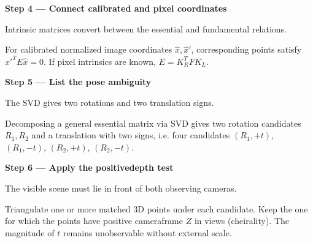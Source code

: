 \documentclass[letterpaper,11pt,english,openany,oneside]{jupyterBook}
\begin{document}
\par

\par\medskip{}
{\color{QuizStepRed}\bfseries Step 4 — Connect calibrated and pixel coordinates}\par\smallskip

\sphinxAtStartPar
{} Intrinsic matrices convert between the essential and fundamental relations.

\sphinxAtStartPar
For calibrated normalized image coordinates {\color{QuizMathBlue} \(\hat x,\hat x'\)}, corresponding points satisfy {\color{QuizMathBlue} \(\hat x'^TE\hat x=0\)}. If pixel intrinsics are known, {\color{QuizMathBlue} \(E=K_R^TFK_L\)}.

\par

\par\medskip{}
{\color{QuizStepRed}\bfseries Step 5 — List the pose ambiguity}\par\smallskip

\sphinxAtStartPar
{} The SVD gives two rotations and two translation signs.

\sphinxAtStartPar
Decomposing a general essential matrix via SVD gives two rotation candidates {\color{QuizMathBlue} \(R_1,R_2\)} and a translation  with two signs, i.e. four candidates {\color{QuizMathBlue} \((R_1,+t)\)}, {\color{QuizMathBlue} \((R_1,-t)\)}, {\color{QuizMathBlue} \((R_2,+t)\)}, {\color{QuizMathBlue} \((R_2,-t)\)}.

\par

\par\medskip{}
{\color{QuizStepRed}\bfseries Step 6 — Apply the positive\sphinxhyphen{}depth test}\par\smallskip

\sphinxAtStartPar
{} The visible scene must lie in front of both observing cameras.

\sphinxAtStartPar
Triangulate one or more matched 3D points under each candidate. Keep the one for which the points have positive camera\sphinxhyphen{}frame {\color{QuizMathBlue} \(Z\)} in  views (cheirality). The magnitude of {\color{QuizMathBlue} \(t\)} remains unobservable without external scale.

\par
\end{document}
